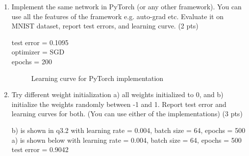 \documentclass[10pt]{article}
\theoremstyle{definition}
\newenvironment{soln}{
    \leavevmode\color{blue}\ignorespaces
}{}
\begin{document}
\begin{enumerate}
\begin{soln}
\begin{figure}[H]
              \end{figure}
          \end{soln}
    \item Implement the same network in PyTorch (or any other framework). You can use all the features of the framework e.g. auto-grad etc. Evaluate it on MNIST dataset, report test errors, and learning curve. (2 pts) \\
          \begin{soln}
              test error = 0.1095 \\
              optimizer = SGD \\
              epochs = 200 \\
              \begin{figure}[H]
                \centering  %
                \caption{Learning curve for PyTorch implementation}
                \label{Fig2.main}
              \end{figure}
          \end{soln}
    \item Try different weight initialization a) all weights initialized to 0, and b) initialize the weights randomly between -1 and 1. Report test error and learning curves for both. (You can use either of the implementations) (3 pts) \\
          \begin{soln}
            b) is shown in q3.2 with learning rate = 0.004, batch size = 64, epochs = 500 \\
            a) is shown below with learning rate = 0.004, batch size = 64, epochs = 500 \\
            test error = 0.9042 \\
            \begin{figure}[H]
                \centering  %

\end{figure}
\end{soln}
\end{enumerate}
\end{document}
